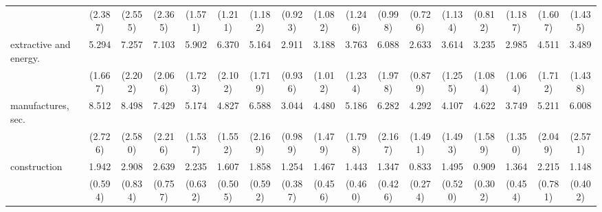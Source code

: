 {\begin{tabular}{l*{16}{c}}
                    &     (2.387)         &     (2.555)         &     (2.365)         &     (1.571)         &     (1.211)         &     (1.182)         &     (0.923)         &     (1.082)         &     (1.246)         &     (0.998)         &     (0.726)         &     (1.134)         &     (0.812)         &     (1.187)         &     (1.607)         &     (1.435)         \\
[1em]
extractive and energy.&       5.294\sym{***}&       7.257\sym{***}&       7.103\sym{***}&       5.902\sym{***}&       6.370\sym{***}&       5.164\sym{***}&       2.911\sym{***}&       3.188\sym{***}&       3.763\sym{***}&       6.088\sym{***}&       2.633\sym{**} &       3.614\sym{***}&       3.235\sym{***}&       2.985\sym{**} &       4.511\sym{***}&       3.489\sym{**} \\
                    &     (1.667)         &     (2.202)         &     (2.066)         &     (1.723)         &     (2.102)         &     (1.719)         &     (0.936)         &     (1.012)         &     (1.234)         &     (1.978)         &     (0.879)         &     (1.255)         &     (1.084)         &     (1.064)         &     (1.712)         &     (1.438)         \\
[1em]
manufactures, sec.  &       8.512\sym{***}&       8.498\sym{***}&       7.429\sym{***}&       5.174\sym{***}&       4.827\sym{***}&       6.588\sym{***}&       3.044\sym{***}&       4.480\sym{***}&       5.186\sym{***}&       6.282\sym{***}&       4.292\sym{***}&       4.107\sym{***}&       4.622\sym{***}&       3.749\sym{***}&       5.211\sym{***}&       6.008\sym{***}\\
                    &     (2.726)         &     (2.580)         &     (2.216)         &     (1.537)         &     (1.552)         &     (2.169)         &     (0.989)         &     (1.479)         &     (1.798)         &     (2.167)         &     (1.491)         &     (1.493)         &     (1.589)         &     (1.350)         &     (2.049)         &     (2.571)         \\
[1em]
construction        &       1.942\sym{*}  &       2.908\sym{***}&       2.639\sym{***}&       2.235\sym{**} &       1.607         &       1.858         &       1.254         &       1.467         &       1.443         &       1.347         &       0.833         &       1.495         &       0.909         &       1.364         &       2.215\sym{*}  &       1.148         \\
                    &     (0.594)         &     (0.834)         &     (0.757)         &     (0.632)         &     (0.505)         &     (0.592)         &     (0.387)         &     (0.456)         &     (0.460)         &     (0.426)         &     (0.274)         &     (0.520)         &     (0.302)         &     (0.454)         &     (0.781)         &     (0.402)         \\

\end{tabular}}
